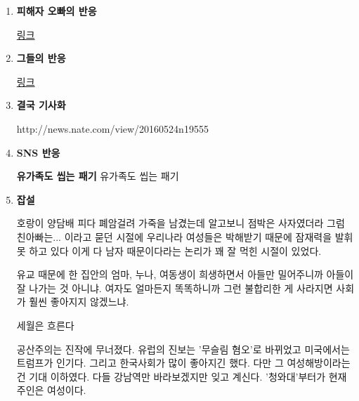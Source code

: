 \vspace{5mm}
\begin{enumerate}
    \item \textbf{피해자 오빠의 반응}
    \vspace{5mm}

    \href{http://news.donga.com/BestClick/3/all/20160524/78280176/1}{링크}
    \vspace{5mm}

    \item \textbf{그들의 반응}
    \vspace{5mm}

    \href{http://mlbpark.donga.com/mlbpark/b.php?m=search&p=1&b=bullpen2&id=5113437&select=sct&query=%EC%97%AC%EC%8B%9C&user=&reply=}{링크}
    \vspace{5mm}

    \item \textbf{ 결국 기사화}
    \vspace{5mm}

    http://news.nate.com/view/20160524n19555
    \vspace{5mm}

    \item \textbf{SNS 반응}
    \vspace{5mm}

    \textbf{유가족도 씹는 패기}
    유가족도 씹는 패기

    \vspace{5mm}
 
    \item \textbf{잡설}
  
    호랑이 양담배 피다 폐암걸려 가죽을 남겼는데 알고보니 점박은 사자였더라 그럼 친아빠는... 이라고 묻던 시절에
    우리나라 여성들은 박해받기 때문에 잠재력을 발휘 못 하고 있다 이게 다 남자 때문이다라는 논리가 꽤 잘 먹힌 시절이 있었다.
    \vspace{5mm}
  
  
    유교 때문에 한 집안의 엄마, 누나, 여동생이 희생하면서 아들만 밀어주니까 아들이 잘 나가는 것 아니냐.
    여자도 얼마든지 똑똑하니까 그런 불합리한 게 사라지면 사회가 훨씬 좋아지지 않겠느냐.
    \vspace{5mm}
   
  
    세월은 흐른다
    \vspace{5mm}
  
  
    공산주의는 진작에 무너졌다.
    유럽의 진보는 '무슬림 혐오'로 바뀌었고 미국에서는 트럼프가 인기다.
    그리고 한국사회가 많이 좋아지긴 했다. 다만 그 여성해방이라는 건 기대 이하였다.
    다들 강남역만 바라보겠지만 잊고 계신다. '청와대'부터가 현재 주인은 여성이다.
    \vspace{5mm}
  

\end{enumerate}
